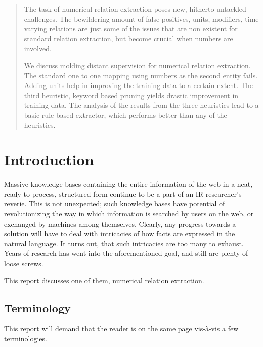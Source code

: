\documentclass[a4paper,10pt]{article}
\begin{document}
\begin{abstract}
The task of numerical relation extraction poses new, hitherto untackled challenges. The bewildering amount of false positives, units, 
modifiers, time varying relations are just some of the issues that are non existent for standard relation extraction, but become 
crucial when numbers are involved.

We discuss molding distant supervision for numerical relation extraction. The standard one to one mapping using numbers as the second entity 
fails. Adding units help in improving the training data to a certain extent. The third heuristic, keyword based pruning yields drastic improvement
in training data.
The analysis of the results from the three heuristics lead to a basic rule based extractor, which performs better than any of the heuristics.

\end{abstract}

\section{Introduction}
Massive knowledge bases containing the entire information of the web in a neat, ready to process, structured form continue to be a part of an IR researcher's reverie.
This is not unexpected; such knowledge bases have potential of revolutionizing the way in which information is searched by users on the web, or exchanged by machines among
themselves. 
Clearly, any progress towards a solution will have to deal with intricacies of how facts are expressed in the natural language.
It turns out, that such intricacies are too many to exhaust. Years of research has went into the aforementioned goal, and still
are plenty of loose screws.

This report discusses one of them, numerical relation extraction.

\subsection{Terminology}
This report will demand that the reader is on the same page vis-à-vis a few terminologies.
\end{document}
